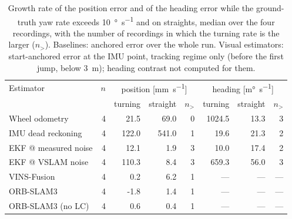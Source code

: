 \begin{table}[htbp]
\centering
\footnotesize
\caption[Growth of position and heading error while turning against straights, every estimator.]{Growth rate of the position error and of the heading error while the ground-truth yaw rate exceeds \SI{10}{\degree\per\second} and on straights, median over the four recordings, with the number of recordings in which the turning rate is the larger ($n_{>}$). Baselines: anchored error over the whole run. Visual estimators: start-anchored error at the IMU point, tracking regime only (before the first jump, below \SI{3}{\metre}); heading contrast not computed for them.}
\label{tab:e1i-turning}
\begin{tabular}{lrrrrrrr}
\toprule
Estimator & $n$ & \multicolumn{3}{c}{position [\si{\milli\metre\per\second}]} & \multicolumn{3}{c}{heading [\si{\milli\degree\per\second}]} \\
 & & turning & straight & $n_{>}$ & turning & straight & $n_{>}$ \\
\midrule
Wheel odometry & 4 & 21.5 & 69.0 & 0 & 1024.5 & 13.3 & 3 \\
IMU dead reckoning & 4 & 122.0 & 541.0 & 1 & 19.6 & 21.3 & 2 \\
EKF @ measured noise & 4 & 12.1 & 1.9 & 3 & 10.0 & 17.4 & 2 \\
EKF @ VSLAM noise & 4 & 110.3 & 8.4 & 3 & 659.3 & 56.0 & 3 \\
\midrule
VINS-Fusion & 4 & 0.2 & 6.2 & 1 & --- & --- & --- \\
ORB-SLAM3 & 4 & -1.8 & 1.4 & 1 & --- & --- & --- \\
ORB-SLAM3 (no LC) & 4 & 0.6 & 0.4 & 1 & --- & --- & --- \\
\bottomrule
\end{tabular}
\end{table}
